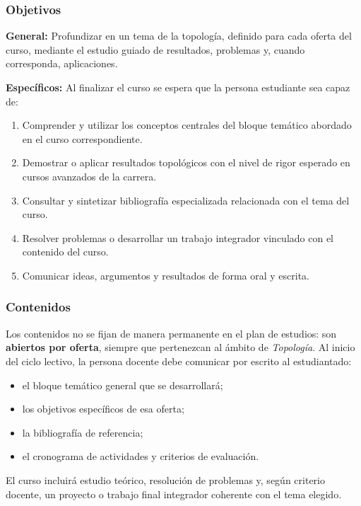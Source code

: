 \begin{refsection}
\subsubsection*{Objetivos}

\textbf{General:} Profundizar en un tema de la topología, definido para cada oferta del curso, mediante el estudio guiado de resultados, problemas y, cuando corresponda, aplicaciones.

\textbf{Específicos:} Al finalizar el curso se espera que la persona estudiante sea capaz de:

\begin{enumerate}
\item Comprender y utilizar los conceptos centrales del bloque temático abordado en el curso correspondiente.
\item Demostrar o aplicar resultados topológicos con el nivel de rigor esperado en cursos avanzados de la carrera.
\item Consultar y sintetizar bibliografía especializada relacionada con el tema del curso.
\item Resolver problemas o desarrollar un trabajo integrador vinculado con el contenido del curso.
\item Comunicar ideas, argumentos y resultados de forma oral y escrita.
\end{enumerate}

\subsubsection*{Contenidos}

Los contenidos no se fijan de manera permanente en el plan de estudios: son \textbf{abiertos por oferta}, siempre que pertenezcan al ámbito de \emph{Topología}. Al inicio del ciclo lectivo, la persona docente debe comunicar por escrito al estudiantado:

\begin{itemize}
\item el bloque temático general que se desarrollará;
\item los objetivos específicos de esa oferta;
\item la bibliografía de referencia;
\item el cronograma de actividades y criterios de evaluación.
\end{itemize}

El curso incluirá estudio teórico, resolución de problemas y, según criterio docente, un proyecto o trabajo final integrador coherente con el tema elegido.


\end{refsection}
